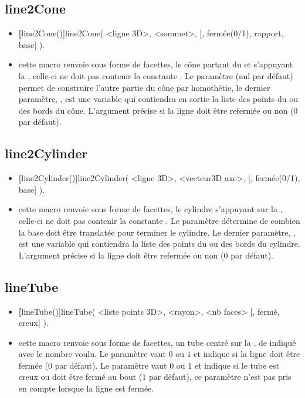 \subsection{line2Cone}
\begin{itemize}
 \item \util \textbf[line2Cone()]{line2Cone( <ligne 3D>, <sommet>, [, fermée(0/1), rapport, base] )}.
 \item \desc cette macro renvoie sous forme de facettes, le cône partant du  et s'appuyant la , celle-ci ne doit pas contenir la constante \jump. Le paramètre  (nul par défaut) permet de construire l'autre partie du cône par homothétie, le dernier paramètre, , est une variable qui contiendra en sortie la liste des points du ou des bords du cône. L'argument  précise si la ligne doit être refermée ou non ($0$ par défaut).
\end{itemize}

\subsection{line2Cylinder}
\begin{itemize}
 \item \util \textbf[line2Cylinder()]{line2Cylinder( <ligne 3D>, <vecteur3D axe>, [, fermée(0/1), base] )}.
 \item \desc cette macro renvoie sous forme de facettes, le cylindre s'appuyant sur la , celle-ci ne doit pas contenir la constante \jump. Le paramètre  détermine de combien la base doit être translatée pour terminer le cylindre. Le dernier paramètre, , est une variable qui contiendra la liste des points du ou des bords du cylindre. L'argument  précise si la ligne doit être refermée ou non ($0$ par défaut).
\end{itemize}


\subsection{lineTube}
\begin{itemize}
 \item \util \textbf[lineTube()]{lineTube( <liste points 3D>, <rayon>, <nb faces> [, fermé, creux] )}.
 \item \desc cette macro renvoie sous forme de facettes, un tube centré sur la , de  indiqué avec le nombre  voulu. Le paramètre  vaut $0$ ou $1$ et indique si la ligne doit être fermée ($0$ par défaut). Le paramètre  vaut $0$ ou $1$ et indique si le tube est creux ou doit être fermé au bout ($1$ par défaut), ce paramètre n'est pas pris en compte lorsque la ligne est fermée.
\end{itemize}


